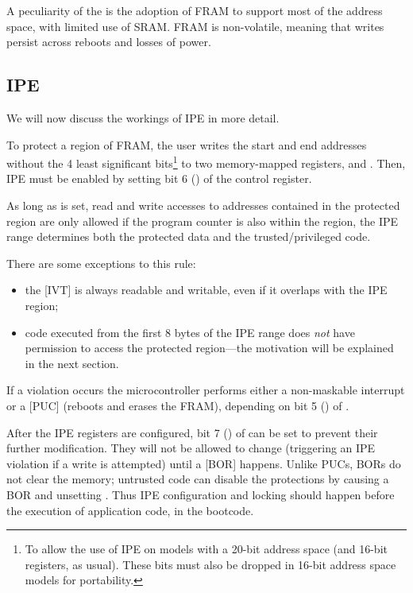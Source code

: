 A peculiarity of the \msp is the adoption of FRAM \cite{slaa628b} to support most of the address space, with limited use of SRAM. FRAM is non-volatile, meaning that writes persist across reboots and losses of power.

\subsection{IPE}
\label{sec:ipe}

We will now discuss the workings of IPE in more detail.

To protect a region of FRAM, the user writes the start and end addresses without the 4 least significant bits\footnote{To allow the use of IPE on models with a 20-bit address space (and 16-bit registers, as usual). These bits must also be dropped in 16-bit address space models for portability.} to two memory-mapped registers,  and . Then, IPE must be enabled by setting bit 6 () of the  control register.

As long as  is set, read and write accesses to addresses contained in the protected region are only allowed if the program counter is also within the region, \ie the IPE range determines both the protected data and the trusted/privileged code.

There are some exceptions to this rule:
\begin{itemize}
\item the [IVT] is always readable and writable, even if it overlaps with the IPE region; %
\item code executed from the first 8 bytes of the IPE range does \emph{not} have permission to access the protected region---the motivation will be explained in the next section.
\end{itemize}

If a violation occurs the microcontroller performs either a non-maskable interrupt or a [PUC] (\ie reboots and erases the FRAM), depending on bit 5 () of .

After the IPE registers are configured, bit 7 () of  can be set to prevent their further modification. They will not be allowed to change (triggering an IPE violation if a write is attempted) until a [BOR] happens. Unlike PUCs, BORs do not clear the memory;
untrusted code can disable the protections by causing a BOR and unsetting . Thus IPE configuration and locking should happen before the execution of application code, \ie in the bootcode.

